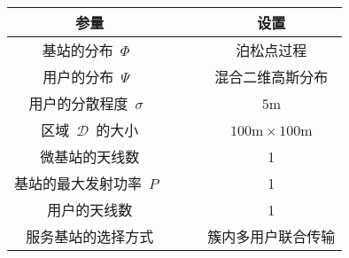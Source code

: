 

\makecover
\clearpage
\begin{table}[htbp]
\label{cluster_zfbf_sim_para}
\vspace{0.5em}\centering\wuhao
\begin{tabular}{cccc}
\toprule[1.5pt]
参量 & & & 设置 \\
\midrule[0.5pt]
基站的分布~$\Phi$~ & & & 泊松点过程 \\
用户的分布~$\Psi$~  & & & 混合二维高斯分布\\
用户的分散程度~$\sigma$~ & & &  ~$5\mathrm{m}$~ \\
区域~$\mathcal{D}$~的大小  & & & ~$100\mathrm{m} \times 100 \mathrm{m}$~ \\
微基站的天线数 & & & 1 \\
基站的最大发射功率~$P$~ & & & 1 \\
用户的天线数 & & & 1 \\
服务基站的选择方式 & & & 簇内多用户联合传输 \\
\bottomrule[1.5pt]
\end{tabular}
\end{table}
